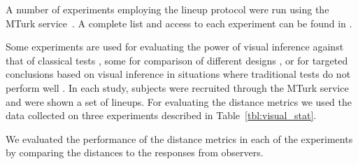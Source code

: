 \documentclass[12pt]{article}\usepackage[]{graphicx}\usepackage[]{color}
\newcommand{\hh}[1]{{\color{magenta} #1}}
\begin{document}
A number of experiments employing the lineup protocol were run
using the MTurk service~\citep{turk}. A complete list and access to each experiment can be found in \citet{majumder:2013}.

Some experiments are used for evaluating the power of visual inference against that of classical tests \citep{majumder:2011}, some for comparison of different designs \citep{hofmann2012graphical, loy:2015}, or for targeted conclusions based on visual inference in situations where traditional tests do not perform well \citep{tengfei:2013}. In each study, subjects were recruited through the MTurk service and were shown a set of lineups.
 For evaluating the distance metrics we used the data collected on three experiments described in Table~\ref{tbl:visual_stat}.


We evaluated the performance of the distance metrics in each of the experiments by comparing  the distances to the responses from observers. 

\end{document}
